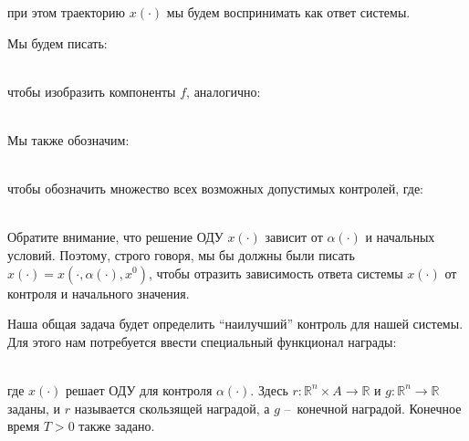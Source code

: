 при этом траекторию $x(\cdot)$ мы будем воспринимать как ответ системы. \\


Мы будем писать: \\

\

чтобы изобразить компоненты $f$, аналогично: \\

\

Мы также обозначим: \\

\myequation{\mathbb{A} = \{ \alpha: [0, \infty) \rightarrow A \, | \, \alpha(\cdot) \, \text{измерима} \} ,}
\

чтобы обозначить множество всех возможных допустимых контролей, где: \\

\

Обратите внимание, что решение ОДУ $x(\cdot)$ зависит от $\alpha(\cdot)$ и начальных условий. Поэтому, строго говоря, мы бы должны были писать $x(\cdot) = x(\cdot, \alpha(\cdot), x^0)$, чтобы отразить зависимость ответа системы $x(\cdot)$ от контроля и начального значения. \\


Наша общая задача будет определить ``наилучший'' контроль для нашей системы. Для этого нам потребуется ввести специальный функционал награды: \\

\

где $x(\cdot)$ решает ОДУ для контроля $\alpha(\cdot)$. Здесь $r: \mathbb{R}^n \times A \rightarrow \mathbb{R}$ и $g: \mathbb{R}^n \rightarrow \mathbb{R}$ заданы, и $r$ называется скользящей наградой, а $g$ – конечной наградой. Конечное время $T > 0$ также задано. \\

